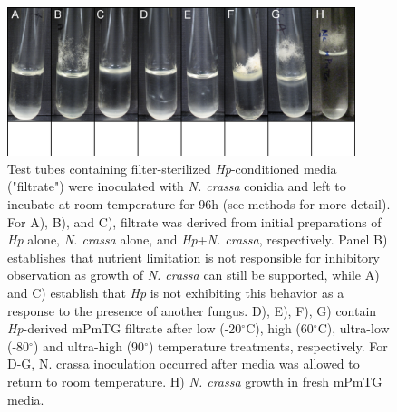 \begin{figure}[hb]
  \centering
  \includegraphics[width=4in]{./Chapter_Inhibition/img/96h_HpNcColdHotFresh.png}
  \caption[Filter-sterilized \textit{Hp}-conditioned media effectively inhibits \textit{N. crassa} growth.]{Test tubes containing filter-sterilized \textit{Hp}-conditioned media ("filtrate") were inoculated with \textit{N. crassa} conidia and left to incubate at room temperature for 96h (see methods for more detail). For A), B), and C), filtrate was derived from initial preparations of \textit{Hp} alone, \textit{N. crassa} alone, and \textit{Hp}+\textit{N. crassa}, respectively. Panel B) establishes that nutrient limitation is not responsible for inhibitory observation as growth of \textit{N. crassa} can still be supported, while A) and C) establish that \textit{Hp} is not exhibiting this behavior as a response to the presence of another fungus. D), E), F), G) contain \textit{Hp}-derived mPmTG filtrate after low (-20$^{\circ}$C), high (60$^{\circ}$C), ultra-low (-80$^{\circ}$) and ultra-high (90$^{\circ}$) temperature treatments, respectively. For D-G, N. crassa inoculation occurred after media was allowed to return to room temperature. H) \textit{N. crassa} growth in fresh mPmTG media.}
  \label{fig:ChInhib_FilterTempAssay}
\end{figure}


